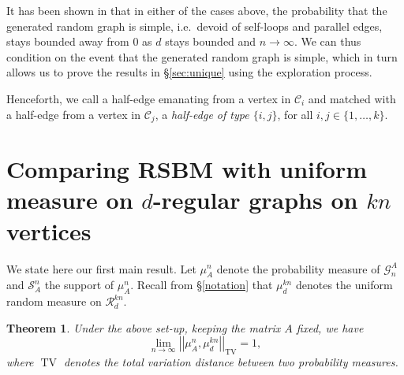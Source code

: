 \documentclass[11pt,reqno]{amsart}
\newtheorem{theorem}{Theorem}[section]
\theoremstyle{definition}
\theoremstyle{remark}
\theoremstyle{conjecture}
\DeclareMathOperator{\tv}{TV}
\begin{document}
It has been shown in \cite{08} that in either of the cases above, the probability that the generated random graph is simple, i.e.\ devoid of self-loops and parallel edges, stays bounded away from $0$ as $d$ stays bounded and $n \rightarrow \infty$. We can thus condition on the event that the generated random graph is simple, which in turn allows us to prove the results in \S\ref{sec:unique} using the exploration process. 

Henceforth, we call a half-edge emanating from a vertex in $\mathcal{C}_{i}$ and matched with a half-edge from a vertex in $\mathcal{C}_{j}$, a \emph{half-edge of type $\{i, j\}$}, for all $i, j \in \{1, \ldots, k\}$. 

\section{Comparing RSBM with uniform measure on $d$-regular graphs on $kn$ vertices}\label{sec:measure_diff}
We state here our first main result. Let $\mu^{n}_{A}$ denote the probability measure of $\mathcal{G}_{n}^{A}$ and $\mathcal{S}^{n}_{A}$ the support of $\mu^{n}_{A}$. Recall from \S\ref{notation} that $\mu^{kn}_{d}$ denotes the uniform random measure on $\mathcal{R}^{kn}_{d}$. 

\begin{theorem}\label{main_1}
Under the above set-up, keeping the matrix $A$ fixed, we have
\begin{equation}
\lim_{n \rightarrow \infty} \left|\left|\mu^{n}_{A}, \mu^{kn}_{d}\right|\right|_{\tv} = 1,
\end{equation}
where $\tv$ denotes the total variation distance between two probability measures.
\end{theorem}
\end{document}
